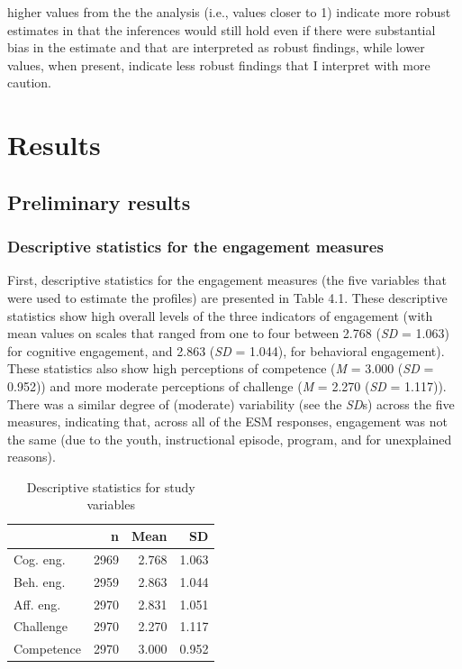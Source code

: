 \documentclass[]{msu-thesis}
\theoremstyle{definition}
\theoremstyle{definition}
\theoremstyle{definition}
\theoremstyle{remark}
\begin{document}
higher values from the the analysis (i.e., values closer to 1) indicate
more robust estimates in that the inferences would still hold even if
there were substantial bias in the estimate and that are interpreted as
robust findings, while lower values, when present, indicate less robust
findings that I interpret with more caution.

\chapter{Results}\label{results}

\section{Preliminary results}\label{preliminary-results}

\subsection{Descriptive statistics for the engagement
measures}\label{descriptive-statistics-for-the-engagement-measures}

First, descriptive statistics for the engagement measures (the five
variables that were used to estimate the profiles) are presented in
Table 4.1. These descriptive statistics show high overall levels of the
three indicators of engagement (with mean values on scales that ranged
from one to four between 2.768 (\emph{SD} = 1.063) for cognitive
engagement, and 2.863 (\emph{SD} = 1.044), for behavioral engagement).
These statistics also show high perceptions of competence (\emph{M} =
3.000 (\emph{SD} = 0.952)) and more moderate perceptions of challenge
(\emph{M} = 2.270 (\emph{SD} = 1.117)). There was a similar degree of
(moderate) variability (see the \emph{SD}s) across the five measures,
indicating that, across all of the ESM responses, engagement was not the
same (due to the youth, instructional episode, program, and for
unexplained reasons).

\begin{table}

\caption{\label{tab:unnamed-chunk-7}Descriptive statistics for study variables}
\centering
\begin{tabular}[t]{lrrr}
\toprule
 & n & Mean & SD\\
\midrule
Cog. eng. & 2969 & 2.768 & 1.063\\
Beh. eng. & 2959 & 2.863 & 1.044\\
Aff. eng. & 2970 & 2.831 & 1.051\\
Challenge & 2970 & 2.270 & 1.117\\
Competence & 2970 & 3.000 & 0.952\\
\bottomrule
\end{tabular}
\end{table}
\end{document}
